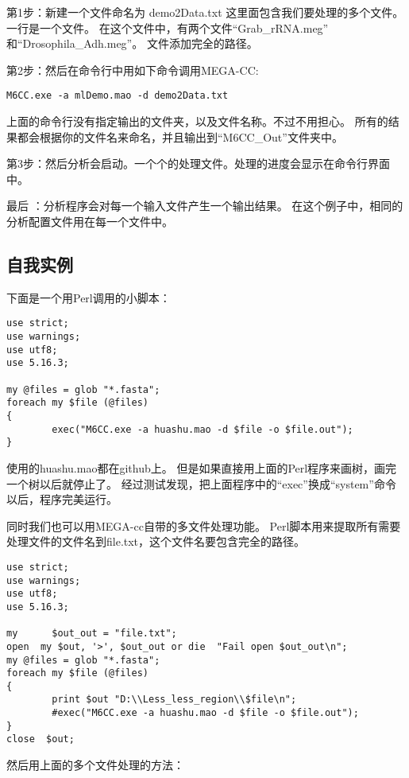 \documentclass{ctexart}
\begin{document}
第1步：新建一个文件命名为 demo2Data.txt 这里面包含我们要处理的多个文件。
        一行是一个文件。
        在这个文件中，有两个文件“Grab\_rRNA.meg” 和“Drosophila\_Adh.meg”。
        文件添加完全的路径。

第2步：然后在命令行中用如下命令调用MEGA-CC:

\lstset{frame=single,frameround=tttt,language=Perl}
\begin{lstlisting}
M6CC.exe -a mlDemo.mao -d demo2Data.txt
\end{lstlisting}
        
      
       上面的命令行没有指定输出的文件夹，以及文件名称。不过不用担心。
       所有的结果都会根据你的文件名来命名，并且输出到“M6CC\_Out”文件夹中。

第3步：然后分析会启动。一个个的处理文件。处理的进度会显示在命令行界面中。

最后 ：分析程序会对每一个输入文件产生一个输出结果。
        在这个例子中，相同的分析配置文件用在每一个文件中。
\subsection{自我实例}
\label{sec-3-8}

下面是一个用Perl调用的小脚本：

\lstset{frame=single,frameround=tttt,language=Perl}
\begin{lstlisting}
use strict;
use warnings;
use utf8;
use 5.16.3;

my @files = glob "*.fasta";
foreach my $file (@files)
{
        exec("M6CC.exe -a huashu.mao -d $file -o $file.out");
}
\end{lstlisting}
使用的huashu.mao都在github上。
但是如果直接用上面的Perl程序来画树，画完一个树以后就停止了。
经过测试发现，把上面程序中的“exec”换成“system”命令以后，程序完美运行。

同时我们也可以用MEGA-cc自带的多文件处理功能。
Perl脚本用来提取所有需要处理文件的文件名到file.txt，这个文件名要包含完全的路径。

\lstset{frame=single,frameround=tttt,language=Perl}
\begin{lstlisting}
use strict;
use warnings;
use utf8;
use 5.16.3;

my      $out_out = "file.txt";
open  my $out, '>', $out_out or die  "Fail open $out_out\n";
my @files = glob "*.fasta";
foreach my $file (@files)
{
        print $out "D:\\Less_less_region\\$file\n";
        #exec("M6CC.exe -a huashu.mao -d $file -o $file.out");
}
close  $out;
\end{lstlisting}
然后用上面的多个文件处理的方法：
\end{document}
